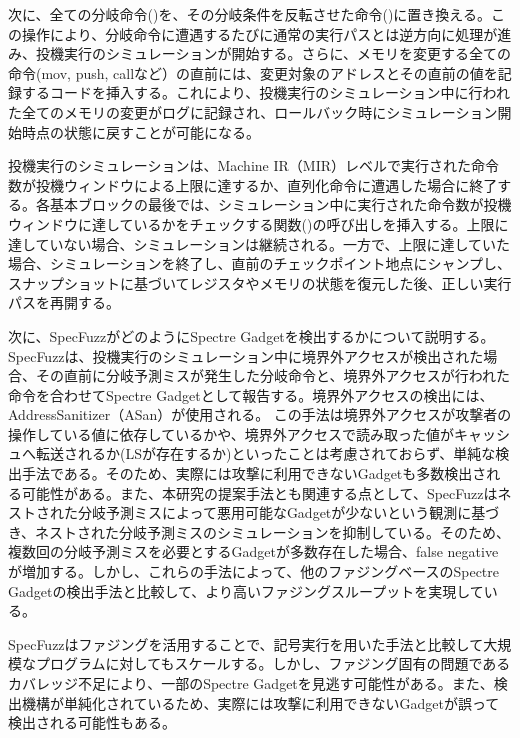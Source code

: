 次に、全ての分岐命令()を、その分岐条件を反転させた命令()に置き換える。この操作により、分岐命令に遭遇するたびに通常の実行パスとは逆方向に処理が進み、投機実行のシミュレーションが開始する。さらに、メモリを変更する全ての命令(mov, push, callなど）の直前には、変更対象のアドレスとその直前の値を記録するコードを挿入する。これにより、投機実行のシミュレーション中に行われた全てのメモリの変更がログに記録され、ロールバック時にシミュレーション開始時点の状態に戻すことが可能になる。\par
投機実行のシミュレーションは、Machine IR（MIR）レベルで実行された命令数が投機ウィンドウによる上限に達するか、直列化命令に遭遇した場合に終了する。各基本ブロックの最後では、シミュレーション中に実行された命令数が投機ウィンドウに達しているかをチェックする関数()の呼び出しを挿入する。上限に達していない場合、シミュレーションは継続される。一方で、上限に達していた場合、シミュレーションを終了し、直前のチェックポイント地点にシャンプし、スナップショットに基づいてレジスタやメモリの状態を復元した後、正しい実行パスを再開する。\par
次に、SpecFuzzがどのようにSpectre Gadgetを検出するかについて説明する。SpecFuzzは、投機実行のシミュレーション中に境界外アクセスが検出された場合、その直前に分岐予測ミスが発生した分岐命令と、境界外アクセスが行われた命令を合わせてSpectre Gadgetとして報告する。境界外アクセスの検出には、AddressSanitizer（ASan）\cite{serebryany2012addresssanitizer}が使用される。
この手法は境界外アクセスが攻撃者の操作している値に依存しているかや、境界外アクセスで読み取った値がキャッシュへ転送されるか(LSが存在するか)といったことは考慮されておらず、単純な検出手法である。そのため、実際には攻撃に利用できないGadgetも多数検出される可能性がある\cite{qi2021spectaint}。また、本研究の提案手法とも関連する点として、SpecFuzzはネストされた分岐予測ミスによって悪用可能なGadgetが少ないという観測に基づき、ネストされた分岐予測ミスのシミュレーションを抑制している。そのため、複数回の分岐予測ミスを必要とするGadgetが多数存在した場合、false negativeが増加する。しかし、これらの手法によって、他のファジングベースのSpectre Gadgetの検出手法\cite{qi2021spectaint,johannesmeyer2022kasper}と比較して、より高いファジングスループットを実現している。\par

SpecFuzzはファジングを活用することで、記号実行を用いた手法と比較して大規模なプログラムに対してもスケールする。しかし、ファジング固有の問題であるカバレッジ不足により、一部のSpectre Gadgetを見逃す可能性がある。また、検出機構が単純化されているため、実際には攻撃に利用できないGadgetが誤って検出される可能性もある。
